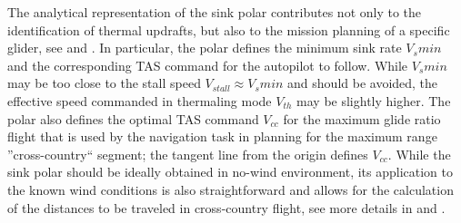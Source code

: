 \documentclass{ifacconf}
\begin{document}
The analytical representation of the sink polar contributes not only to the
identification of thermal updrafts, but also to the mission planning of a
specific glider, see \cite{Piggott:1997} and \cite{FAA:2011}. In particular,
the polar defines the minimum sink rate $V_{s}min$ and the corresponding TAS
command for the autopilot to follow. While $V_{s}min$ may be too close to the
stall speed $V_{stall} \approx V_{s}min$ and should be avoided, the effective
speed commanded in thermaling mode $V_{th}$ may be slightly higher. The polar
also defines the optimal TAS command $V_{cc}$ for the maximum glide ratio
flight that is used by the navigation task in planning for the maximum range
''cross-country`` segment; the tangent line from the origin defines $V_{cc}$.
While the sink polar should be ideally obtained in no-wind environment, its
application to the known wind conditions is also straightforward and allows
for the calculation of the distances to be traveled in cross-country flight,
see more details in \cite{Piggott:1997} and \cite{FAA:2011}.
\end{document}

